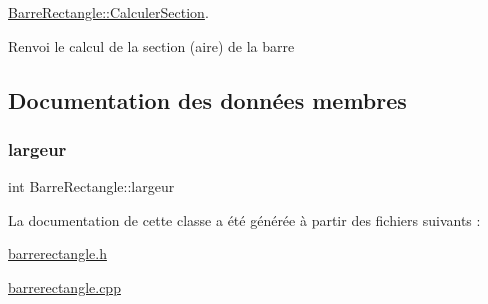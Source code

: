 \hyperlink{class_barre_rectangle_aca359a79b9e74a94867ccaa4341f51ae}{Barre\+Rectangle\+::\+Calculer\+Section}. 

Renvoi le calcul de la section (aire) de la barre 

\subsection{Documentation des données membres}
\mbox{\label{class_barre_rectangle_a6805bad77d9cbdf787a911e0841d6d35}} 
\subsubsection{\texorpdfstring{largeur}{largeur}}
{\footnotesize\ttfamily int Barre\+Rectangle\+::largeur\hspace{0.3cm}{\ttfamily [private]}}



La documentation de cette classe a été générée à partir des fichiers suivants \+:\begin{DoxyCompactItemize}
\item 
\hyperlink{barrerectangle_8h}{barrerectangle.\+h}\item 
\hyperlink{barrerectangle_8cpp}{barrerectangle.\+cpp}\end{DoxyCompactItemize}
